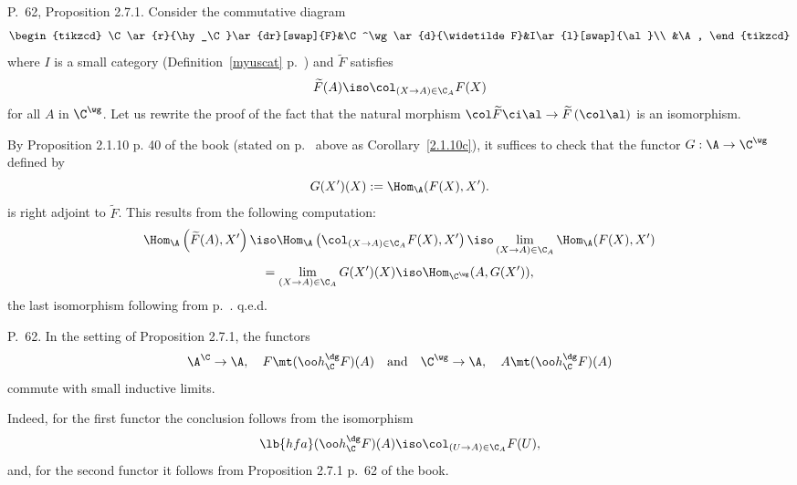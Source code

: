 \documentclass[12pt]{article}
\theoremstyle{remark}
\theoremstyle{definition}
\begin{document}
\begin{s}
\end{s}





\begin{s}
P.~62, Proposition 2.7.1. Consider the commutative diagram 
$$
\begin{tikzcd}
\C\ar{r}{\hy_\C}\ar{dr}[swap]{F}&\C^\wg\ar{d}{\widetilde F}&I\ar{l}[swap]{\al}\\
&\A,
\end{tikzcd}
$$
where $I$ is a small category (Definition~\ref{myuscat} p.~) and $\widetilde F$ satisfies 
$$
\widetilde F(A)\iso\col_{(X\to A)\in\C_A}F(X)
$$ 
for all $A$ in $\C^\wg$. Let us rewrite the proof of the fact that the natural morphism $\col\widetilde F\ci\al\to\widetilde F\left(\col\al\right)$ is an isomorphism. 

By Proposition 2.1.10 p. 40 of the book (stated on p.~ above as Corollary~\ref{2.1.10c}), it suffices to check that the functor $G:\A\to\C^\wg$ defined by 
$$
G(X')(X):=\Hom_{\A}(F(X),X').
$$ 
is right adjoint to $\widetilde F$. This results from the following computation: 
$$
\Hom_{\A}\left(\widetilde F(A),X'\right)\iso
\Hom_{\A}\left(\col_{(X\to A)\in\C_A}F(X),X'\right)\iso 
\lim_{(X\to A)\in\C_A}\Hom_{\A}(F(X),X')
$$
$$
=\lim_{(X\to A)\in\C_A}G(X')(X)\iso\Hom_{\C^\wg}(A,G(X')), 
$$ 
the last isomorphism following from  p.~. q.e.d.
\end{s}

%

\begin{s}
P.~62. In the setting of Proposition 2.7.1, the functors
$$
\A^\C\to\A,\quad F\mt(\oo h_\C^\dg F)(A)\quad\text{and}\quad
\C^\wg\to\A,\quad A\mt(\oo h_\C^\dg F)(A)
$$ 
commute with small inductive limits. 

Indeed, for the first functor the conclusion follows from the isomorphism 
\begin{equation}\lb{hfa}
(\oo h_\C^\dg F)(A)\iso\col_{(U\to A)\in\C_A}F(U),
\end{equation}
and, for the second functor it follows from Proposition 2.7.1 p.~62 of the book.
\end{s} 
\end{document}

